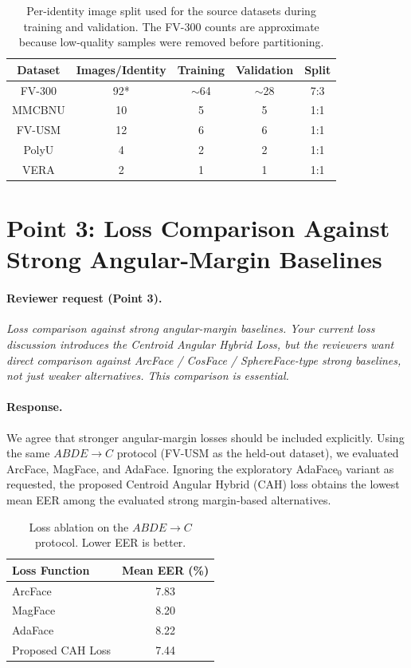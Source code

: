 \documentclass[11pt]{article}
\begin{document}
\begin{table}[ht!]
    \centering
    \scriptsize
    \begin{tabular}{|c|c|c|c|c|}
        \hline
        Dataset & Images/Identity & Training & Validation & Split \\
        \hline
        FV-300 & 92* & $\sim$64 & $\sim$28 & 7:3 \\
        MMCBNU & 10 & 5 & 5 & 1:1 \\
        FV-USM & 12 & 6 & 6 & 1:1 \\
        PolyU & 4 & 2 & 2 & 1:1 \\
        VERA & 2 & 1 & 1 & 1:1 \\
        \hline
    \end{tabular}
    \caption{Per-identity image split used for the source datasets during training and validation. The FV-300 counts are approximate because low-quality samples were removed before partitioning.}
    \label{tab:rebuttal_trainval_split}
\end{table}

\section*{Point 3: Loss Comparison Against Strong Angular-Margin Baselines}

\paragraph{Reviewer request (Point 3).}
\emph{Loss comparison against strong angular-margin baselines. Your current loss discussion introduces the Centroid Angular Hybrid Loss, but the reviewers want direct comparison against ArcFace / CosFace / SphereFace-type strong baselines, not just weaker alternatives. This comparison is essential.}

\paragraph{Response.}
We agree that stronger angular-margin losses should be included explicitly. Using the same $ABDE \rightarrow C$ protocol (FV-USM as the held-out dataset), we evaluated ArcFace, MagFace, and AdaFace. Ignoring the exploratory AdaFace$_0$ variant as requested, the proposed Centroid Angular Hybrid (CAH) loss obtains the lowest mean EER among the evaluated strong margin-based alternatives.

\begin{table}[ht!]
    \centering
    \begin{tabular}{|l|c|}
        \hline
        Loss Function & Mean EER (\%) \\
        \hline
        ArcFace & 7.83 \\
        MagFace & 8.20 \\
        AdaFace & 8.22 \\
        Proposed CAH Loss & 7.44 \\
        \hline
    \end{tabular}
    \caption{Loss ablation on the $ABDE \rightarrow C$ protocol. Lower EER is better.}
    \label{tab:rebuttal_loss_ablation}
\end{table}
\end{document}
